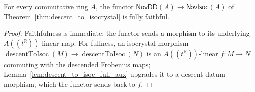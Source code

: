 \begin{proposition}
  \label{prop:descent_to_isoc_fully_faithful}
  \leanok
  For every commutative ring $A$, the functor
  $\mathsf{NovDD}(A) \to \mathsf{NovIsoc}(A)$ of
  Theorem~\ref{thm:descent_to_isocrystal} is fully faithful.
\end{proposition}

\begin{proof}
  \leanok
  Faithfulness is immediate: the functor sends a morphism to its underlying
  $A((t^{\mathbb{R}}))$-linear map.  For fullness, an isocrystal morphism
  $\operatorname{descentToIsoc}(M) \to \operatorname{descentToIsoc}(N)$
  is an $A((t^{\mathbb{R}}))$-linear $f \colon M \to N$ commuting with the
  descended Frobenius maps; Lemma~\ref{lem:descent_to_isoc_full_aux} upgrades it to a
  descent-datum morphism, which the functor sends back to $f$.
\end{proof}
